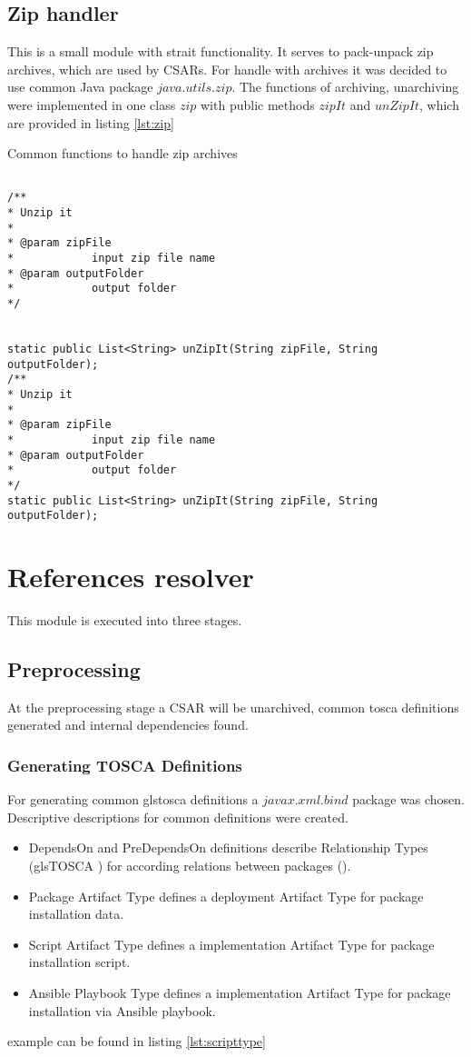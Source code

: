 \subsection*{Zip handler}
This is a small module with strait functionality. It serves to pack-unpack zip archives, which are used by CSARs.
For handle with archives it was decided to use common Java package $java$.$utils$.$zip$.
The functions of archiving, unarchiving were implemented in one class $zip$ with public methods $zipIt$ and $unZipIt$, which are provided in listing \ref{lst:zip}
\begin{Listing}
\caption{Common functions to handle zip archives}
\label{lst:zip}
\begin{lstlisting}

/**
* Unzip it
* 
* @param zipFile
*            input zip file name
* @param outputFolder
*            output folder
*/ 


static public List<String> unZipIt(String zipFile, String outputFolder);
/**
* Unzip it
* 
* @param zipFile
*            input zip file name
* @param outputFolder
*            output folder
*/
static public List<String> unZipIt(String zipFile, String outputFolder);
\end{lstlisting}
\end{Listing}

\section{References resolver}
This module is executed into three stages.

\subsection*{Preprocessing}
At the preprocessing stage a CSAR will be unarchived, common \gls{tosca} definitions generated and internal dependencies found. 


\subsubsection*{Generating TOSCA Definitions}
For generating common gls{tosca} definitions a $javax$.$xml$.$bind$ package was chosen. 
Descriptive descriptions for common definitions were created.
\begin{itemize}
	\item DependsOn and PreDependsOn definitions describe Relationship Types (gls{TOSCA} ) for according relations between packages (). 
	\item Package Artifact Type defines a deployment Artifact Type for package installation data.
	\item Script Artifact Type defines a implementation Artifact Type for package installation script.
	\item Ansible Playbook Type defines a implementation Artifact Type for package installation via Ansible playbook.
\end{itemize}
example can be found in listing \ref{lst:scripttype}

